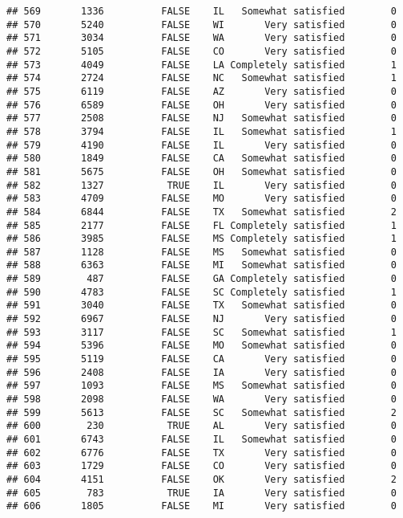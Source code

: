 \documentclass[]{book}
\theoremstyle{definition}
\theoremstyle{definition}
\theoremstyle{remark}
\begin{document}
\begin{verbatim}
## 569       1336          FALSE    IL   Somewhat satisfied        0
## 570       5240          FALSE    WI       Very satisfied        0
## 571       3034          FALSE    WA       Very satisfied        0
## 572       5105          FALSE    CO       Very satisfied        0
## 573       4049          FALSE    LA Completely satisfied        1
## 574       2724          FALSE    NC   Somewhat satisfied        1
## 575       6119          FALSE    AZ       Very satisfied        0
## 576       6589          FALSE    OH       Very satisfied        0
## 577       2508          FALSE    NJ   Somewhat satisfied        0
## 578       3794          FALSE    IL   Somewhat satisfied        1
## 579       4190          FALSE    IL       Very satisfied        0
## 580       1849          FALSE    CA   Somewhat satisfied        0
## 581       5675          FALSE    OH   Somewhat satisfied        0
## 582       1327           TRUE    IL       Very satisfied        0
## 583       4709          FALSE    MO       Very satisfied        0
## 584       6844          FALSE    TX   Somewhat satisfied        2
## 585       2177          FALSE    FL Completely satisfied        1
## 586       3985          FALSE    MS Completely satisfied        1
## 587       1128          FALSE    MS   Somewhat satisfied        0
## 588       6363          FALSE    MI   Somewhat satisfied        0
## 589        487          FALSE    GA Completely satisfied        0
## 590       4783          FALSE    SC Completely satisfied        1
## 591       3040          FALSE    TX   Somewhat satisfied        0
## 592       6967          FALSE    NJ       Very satisfied        0
## 593       3117          FALSE    SC   Somewhat satisfied        1
## 594       5396          FALSE    MO   Somewhat satisfied        0
## 595       5119          FALSE    CA       Very satisfied        0
## 596       2408          FALSE    IA       Very satisfied        0
## 597       1093          FALSE    MS   Somewhat satisfied        0
## 598       2098          FALSE    WA       Very satisfied        0
## 599       5613          FALSE    SC   Somewhat satisfied        2
## 600        230           TRUE    AL       Very satisfied        0
## 601       6743          FALSE    IL   Somewhat satisfied        0
## 602       6776          FALSE    TX       Very satisfied        0
## 603       1729          FALSE    CO       Very satisfied        0
## 604       4151          FALSE    OK       Very satisfied        2
## 605        783           TRUE    IA       Very satisfied        0
## 606       1805          FALSE    MI       Very satisfied        0

\end{verbatim}
\end{document}
